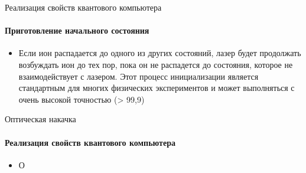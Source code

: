 \documentclass{beamer}
\begin{document}
    \begin{frame}{Реализация свойств квантового компьютера}
    \framesubtitle{Приготовление начального состояния}

    \begin{itemize}
            \item <1-> Если ион распадается до одного из других состояний, лазер будет продолжать возбуждать ион до тех пор, пока он не распадется до состояния, которое не взаимодействует с лазером. Этот процесс инициализации является стандартным для многих физических экспериментов и может выполняться с очень высокой точностью (> 99,9)
    \end{itemize}

    \end{frame}

    \begin{frame}{Оптическая накачка}
    \framesubtitle{Реализация свойств квантового компьютера}

        \begin{itemize}
            \item <1-> О
        \end{itemize}

    \end{frame}
\end{document}
